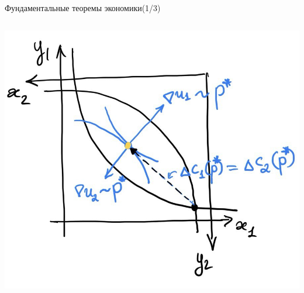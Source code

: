 \documentclass{beamer}
\begin{document}
\begin{frame}{Фундаментальные теоремы экономики(1/3)}
\begin{columns}
        \includegraphics[width=1.0\textwidth]{2_figs/edgeworth_1ft.jpg}


\end{columns}


\end{frame}
\end{document}
